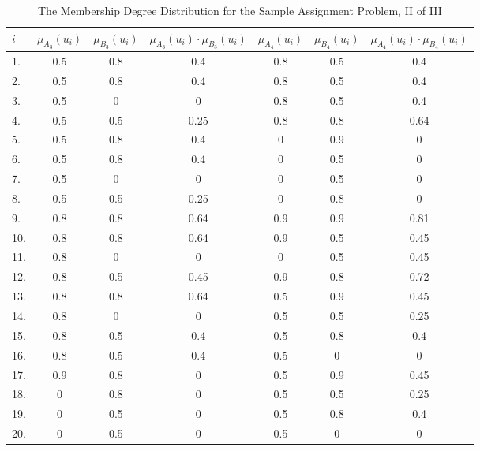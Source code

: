 \documentclass[a4paper,openany]{book}
\begin{document}
				\begin{table}[!th]
					\begin{tabular}{|l|c|c|c|c|c|c|}
					\hline
					\textbf{$i$} & \textbf{$\mu_{A_3}(u_i)$} & \textbf{$\mu_{B_3}(u_i)$} & \textbf{$\mu_{A_3}(u_i)\cdot\mu_{B_3}(u_i)$} & \textbf{$\mu_{A_4}(u_i)$} & \textbf{$\mu_{B_4}(u_i)$} & \textbf{$\mu_{A_4}(u_i)\cdot\mu_{B_4}(u_i)$}\\
					\hline
					1. & 0.5 & 0.8 & 0.4 & 0.8 & 0.5 & 0.4 \\
					\hline
					2. & 0.5 & 0.8 & 0.4 & 0.8 & 0.5 & 0.4 \\
					\hline
					3. & 0.5 & 0 & 0 & 0.8 & 0.5 & 0.4 \\
					\hline
					4. & 0.5 & 0.5 & 0.25 & 0.8 & 0.8 & 0.64 \\
					\hline
					5. & 0.5 & 0.8 & 0.4 & 0 & 0.9 & 0 \\
					\hline
					6. & 0.5 & 0.8 & 0.4 & 0 & 0.5 & 0 \\
					\hline
					7. & 0.5 & 0 & 0 & 0 & 0.5 & 0 \\
					\hline
					8. & 0.5 & 0.5 & 0.25 & 0 & 0.8 & 0 \\
					\hline
					9. & 0.8 & 0.8 & 0.64 & 0.9 & 0.9 & 0.81 \\
					\hline
					10. & 0.8 & 0.8 & 0.64 & 0.9 & 0.5 & 0.45 \\
					\hline
					11. & 0.8 & 0 & 0 & 0 & 0.5 & 0.45 \\
					\hline
					12. & 0.8 & 0.5 & 0.45 & 0.9 & 0.8 & 0.72 \\
					\hline
					13. & 0.8 & 0.8 & 0.64 & 0.5 & 0.9 & 0.45 \\
					\hline
					14. & 0.8 & 0 & 0 & 0.5 & 0.5 & 0.25 \\
					\hline
					15. & 0.8 & 0.5 & 0.4 & 0.5 & 0.8 & 0.4 \\
					\hline
					16. & 0.8 & 0.5 & 0.4 & 0.5 & 0 & 0 \\
					\hline
					17. & 0.9 & 0.8 & 0 & 0.5 & 0.9 & 0.45 \\
					\hline
					18. & 0 & 0.8 & 0 & 0.5 & 0.5 & 0.25 \\
					\hline
					19. & 0 & 0.5 & 0 & 0.5 & 0.8 & 0.4 \\
					\hline
					20. & 0 & 0.5 & 0 & 0.5 & 0 & 0 \\
					\hline
					\end{tabular}
					\caption{The Membership Degree Distribution for the Sample Assignment Problem, II of III}
					\label{ex:table3}
				\end{table}
\end{document}
